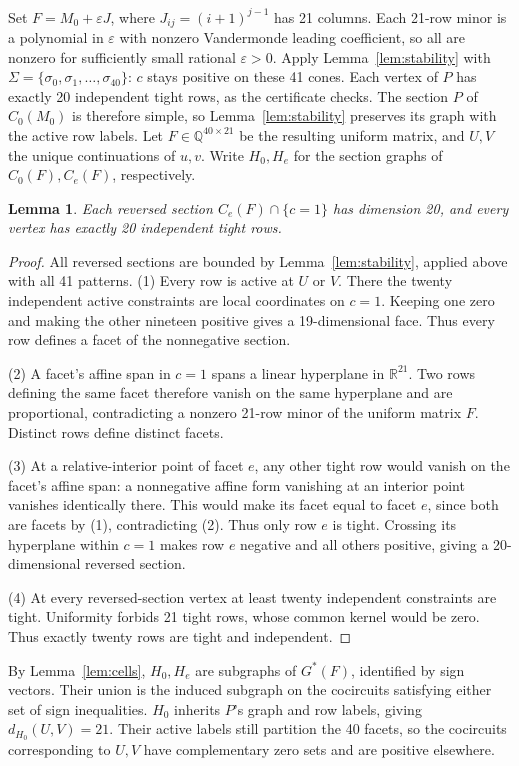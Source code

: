 \documentclass[11pt]{article}
\newtheorem{lemma}[theorem]{Lemma}
\theoremstyle{remark}
\newcommand{\Q}{\mathbb Q}
\newcommand{\R}{\mathbb R}
\begin{document}
Set $F=M_0+\varepsilon J$, where $J_{ij}=(i+1)^{j-1}$ has 21 columns.
Each 21-row minor is a polynomial in $\varepsilon$ with nonzero
Vandermonde leading coefficient, so all are nonzero for sufficiently
small rational $\varepsilon>0$. Apply Lemma~\ref{lem:stability} with
$\Sigma=\{\sigma_0,\sigma_1,\ldots,\sigma_{40}\}$: $c$ stays positive
on these 41 cones.
Each vertex of $P$ has exactly 20 independent tight rows, as the
certificate checks. The section $P$ of $C_0(M_0)$ is therefore simple, so
Lemma~\ref{lem:stability} preserves its graph with the active row labels.
Let $F\in\Q^{40\times21}$ be the resulting uniform matrix, and $U,V$
the unique continuations of $u,v$. Write $H_0,H_e$ for the section
graphs of $C_0(F),C_e(F)$, respectively.
\begin{lemma}\label{lem:facetcross}
Each reversed section $C_e(F)\cap\{c=1\}$ has dimension 20,
and every vertex has exactly 20 independent tight rows.
\end{lemma}
\begin{proof}
All reversed sections are bounded by Lemma~\ref{lem:stability}, applied
above with all 41 patterns. (1) Every row is active at $U$ or $V$. There the twenty independent
active constraints are local coordinates on $c=1$. Keeping one zero
and making the other nineteen positive gives a 19-dimensional face.
Thus every row defines a facet of the nonnegative section.

(2) A facet's affine span in $c=1$ spans a linear hyperplane in
$\R^{21}$. Two rows defining the same facet therefore vanish on the same
hyperplane and are proportional, contradicting a nonzero 21-row minor
of the uniform matrix $F$. Distinct rows define distinct facets.

(3) At a relative-interior point of facet $e$, any other tight row would
vanish on the facet's affine span: a nonnegative affine form vanishing
at an interior point vanishes identically there. This would make its
facet equal to facet $e$, since both are facets by (1), contradicting (2). Thus only row $e$ is tight.
Crossing its hyperplane within $c=1$ makes row $e$ negative and all
others positive, giving a 20-dimensional reversed section.

(4) At every reversed-section vertex at least twenty independent
constraints are tight. Uniformity forbids 21 tight rows, whose common
kernel would be zero. Thus exactly twenty rows are tight and independent.
\end{proof}
By Lemma~\ref{lem:cells}, $H_0,H_e$ are subgraphs of $G^*(F)$,
identified by sign vectors. Their union is the induced subgraph on the
cocircuits satisfying either set of sign inequalities.
$H_0$ inherits $P$'s graph and row labels,
giving $d_{H_0}(U,V)=21$.
Their active labels still partition the 40 facets, so the cocircuits
corresponding to $U,V$ have complementary zero sets and are positive elsewhere.
\end{document}
